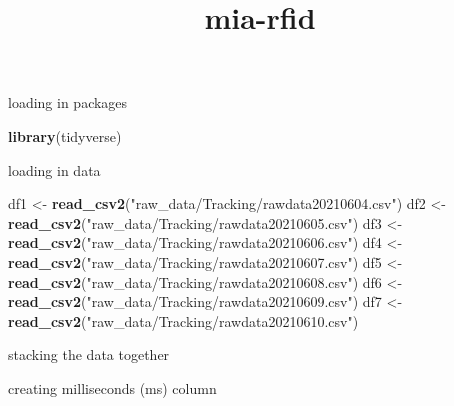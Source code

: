 \documentclass[
]{article}
\title{mia-rfid}
\author{}
\date{\vspace{-2.5em}}
\newenvironment{Shaded}{\begin{snugshade}}{\end{snugshade}}
\newcommand{\KeywordTok}[1]{\textcolor[rgb]{0.13,0.29,0.53}{\textbf{#1}}}
\newcommand{\NormalTok}[1]{#1}
\newcommand{\OperatorTok}[1]{\textcolor[rgb]{0.81,0.36,0.00}{\textbf{#1}}}
\newcommand{\StringTok}[1]{\textcolor[rgb]{0.31,0.60,0.02}{#1}}
\begin{document}
\maketitle

loading in packages

\begin{Shaded}
\begin{Highlighting}[]
\KeywordTok{library}\NormalTok{(tidyverse)}
\end{Highlighting}
\end{Shaded}

loading in data

\begin{Shaded}
\begin{Highlighting}[]
\NormalTok{df1 <-}\StringTok{ }\KeywordTok{read_csv2}\NormalTok{(}\StringTok{"raw_data/Tracking/rawdata20210604.csv"}\NormalTok{)}
\NormalTok{df2 <-}\StringTok{ }\KeywordTok{read_csv2}\NormalTok{(}\StringTok{"raw_data/Tracking/rawdata20210605.csv"}\NormalTok{)}
\NormalTok{df3 <-}\StringTok{ }\KeywordTok{read_csv2}\NormalTok{(}\StringTok{"raw_data/Tracking/rawdata20210606.csv"}\NormalTok{)}
\NormalTok{df4 <-}\StringTok{ }\KeywordTok{read_csv2}\NormalTok{(}\StringTok{"raw_data/Tracking/rawdata20210607.csv"}\NormalTok{)}
\NormalTok{df5 <-}\StringTok{ }\KeywordTok{read_csv2}\NormalTok{(}\StringTok{"raw_data/Tracking/rawdata20210608.csv"}\NormalTok{)}
\NormalTok{df6 <-}\StringTok{ }\KeywordTok{read_csv2}\NormalTok{(}\StringTok{"raw_data/Tracking/rawdata20210609.csv"}\NormalTok{)}
\NormalTok{df7 <-}\StringTok{ }\KeywordTok{read_csv2}\NormalTok{(}\StringTok{"raw_data/Tracking/rawdata20210610.csv"}\NormalTok{)}
\end{Highlighting}
\end{Shaded}

stacking the data together

\begin{Shaded}
\end{Shaded}

creating milliseconds (ms) column
\end{document}
